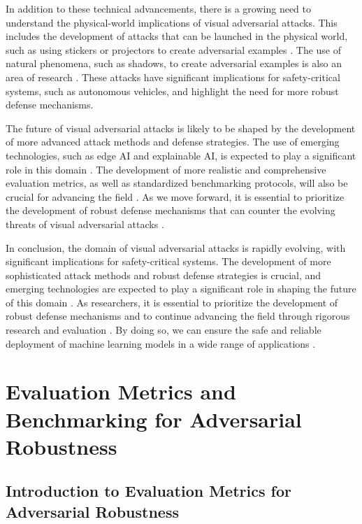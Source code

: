 \documentclass[11pt,a4paper]{article}
\begin{document}
In addition to these technical advancements, there is a growing need to understand the physical-world implications of visual adversarial attacks. This includes the development of attacks that can be launched in the physical world, such as using stickers or projectors to create adversarial examples \cite{doi:10.1007/978-3-030-58589-1_3}. The use of natural phenomena, such as shadows, to create adversarial examples is also an area of research \cite{arxiv:2203.03818}. These attacks have significant implications for safety-critical systems, such as autonomous vehicles, and highlight the need for more robust defense mechanisms.

The future of visual adversarial attacks is likely to be shaped by the development of more advanced attack methods and defense strategies. The use of emerging technologies, such as edge AI and explainable AI, is expected to play a significant role in this domain \cite{doi:10.24963/ijcai.2021/694}. The development of more realistic and comprehensive evaluation metrics, as well as standardized benchmarking protocols, will also be crucial for advancing the field \cite{arxiv:1902.06705}. As we move forward, it is essential to prioritize the development of robust defense mechanisms that can counter the evolving threats of visual adversarial attacks \cite{arxiv:1707.08945}.

In conclusion, the domain of visual adversarial attacks is rapidly evolving, with significant implications for safety-critical systems. The development of more sophisticated attack methods and robust defense strategies is crucial, and emerging technologies are expected to play a significant role in shaping the future of this domain \cite{doi:10.1109/cvpr42600.2020.01426}. As researchers, it is essential to prioritize the development of robust defense mechanisms and to continue advancing the field through rigorous research and evaluation \cite{arxiv:2209.14262}. By doing so, we can ensure the safe and reliable deployment of machine learning models in a wide range of applications \cite{arxiv:1904.00759}.


\section{Evaluation Metrics and Benchmarking for Adversarial Robustness}



\subsection{Introduction to Evaluation Metrics for Adversarial Robustness}
\end{document}
